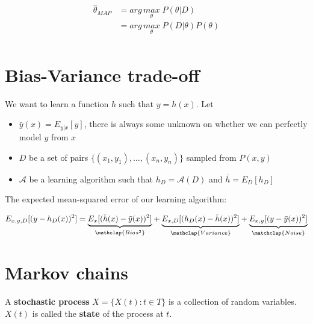 \documentclass[../main.tex]{subfiles}
\begin{document}
\begin{align*}
    \hat{\theta}_{MAP} & = arg\,\underset{\theta}{max}\; P(\theta | D) \\
                       & = arg\,\underset{\theta}{max}\; P(D | \theta) P(\theta) \\
\end{align*}

\section{Bias-Variance trade-off}
We want to learn a function $h$ such that $y = h(x)$.
Let \\
\begin{itemize}
    \item $\bar{y}(x) = E_{y|x}[y]$, there is always some unknown on whether we can perfectly model $y$ from $x$
    \item $D$ be a set of pairs $\{(x_1,y_1),\dots,(x_n,y_n)\}$ sampled from $P(x, y)$
\item $\mathcal{A}$ be a learning algorithm such that $h_D = \mathcal{A}(D)$ and $\bar{h} = E_D[h_D]$
\end{itemize}
The expected mean-squared error of our learning algorithm:

\begin{align*}
    E_{x,y,D}[(y - h_D(x))^2] =
        {\underbrace{E_{x}[(\bar{h}(x) - \bar{y}(x))^2]}_{\mathclap {Bias^2}}} +
        {\underbrace{E_{x,D}[(h_D(x) - \bar{h}(x))^2]}_{\mathclap {Variance}}} +
        {\underbrace{E_{x,y}[(y - \bar{y}(x))^2]}_{\matchclap {Noise}}}
\end{align*}

\section{Markov chains}

A \textbf{stochastic process} $X = \{X(t): t \in T\}$ is a collection of random variables. $X(t)$ is
called the \textbf{state} of the process at $t$. \\
\end{document}
